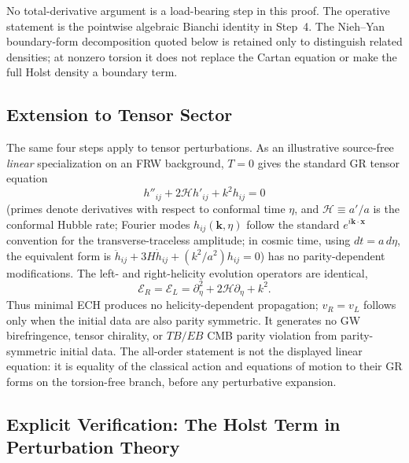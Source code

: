\documentclass[aps,prd,twocolumn,superscriptaddress,showpacs,preprintnumbers,nofootinbib,longbibliography,floatfix]{revtex4-2}
\begin{document}
No total-derivative argument is a load-bearing step in this proof.  The
operative statement is the pointwise algebraic Bianchi identity in Step~4.
The Nieh--Yan boundary-form decomposition quoted below is retained only to
distinguish related densities; at nonzero torsion it does not replace the
Cartan equation or make the full Holst density a boundary term.

\subsection{Extension to Tensor Sector}

The same four steps apply to tensor perturbations.  As an illustrative
source-free \emph{linear} specialization on an FRW background, $T=0$ gives
the standard GR tensor equation
\begin{equation}
h''_{ij} + 2\mathcal{H}h'_{ij} + k^2 h_{ij} = 0
\end{equation}
(primes denote derivatives with respect to conformal time $\eta$, and
$\mathcal{H}\equiv a'/a$ is the conformal Hubble rate; Fourier modes
$h_{ij}(\mathbf{k},\eta)$ follow the standard
$e^{i\mathbf{k}\cdot\mathbf{x}}$ convention for the transverse-traceless
amplitude; in cosmic time, using $dt = a\,d\eta$, the
equivalent form is $\ddot h_{ij} + 3H\dot h_{ij} + (k^2/a^2)h_{ij}=0$)
has no parity-dependent modifications.  The left- and right-helicity
evolution operators are identical,
\begin{equation}
\mathcal E_R=\mathcal E_L=\partial_\eta^2+2\mathcal H\partial_\eta+k^2.
\end{equation}
Thus minimal ECH produces no helicity-dependent propagation; $v_R=v_L$ follows
only when the initial data are also parity symmetric.  It generates no GW
birefringence, tensor chirality, or $TB/EB$ CMB parity violation from
parity-symmetric initial data.
The all-order statement is not the displayed linear equation: it is equality
of the classical action and equations of motion to their GR forms on the
torsion-free branch, before any perturbative expansion.

\subsection{Explicit Verification: The Holst Term in Perturbation Theory}\label{sec:transp_holst}
\end{document}
